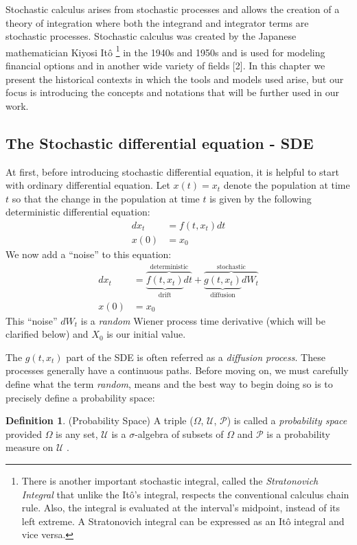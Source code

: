 \documentclass[12pt,twoside]{reedthesis}
\theoremstyle{definition}
\newtheorem{definition}{Definition}[section]
\theoremstyle{definition}
\theoremstyle{remark}
\begin{document}
  Stochastic calculus arises from stochastic processes and allows the
  creation of a theory of integration where both the integrand and
  integrator terms are stochastic processes. Stochastic calculus was
  created by the Japanese mathematician Kiyosi Itô
  \footnote{There is another important stochastic integral, called the \textit{Stratonovich Integral} that unlike the Itô's integral, respects the conventional calculus chain rule. Also, the integral is evaluated at the interval's midpoint, instead of its left extreme. A Stratonovich integral can be expressed as an Itô integral and vice versa.}
  in the 1940s and 1950s and is used for modeling financial options and in
  another wide variety of fields {[}2{]}. In this chapter we present the
  historical contexts in which the tools and models used arise, but our
  focus is introducing the concepts and notations that will be further
  used in our work.
  
  \subsection{The Stochastic differential equation -
  SDE}\label{the-stochastic-differential-equation---sde}
  
  At first, before introducing stochastic differential equation, it is
  helpful to start with ordinary differential equation. Let \(x(t) = x_t\)
  denote the population at time \(t\) so that the change in the population
  at time \(t\) is given by the following deterministic differential
  equation:
  \begin{align}
  dx_t &= f(t, x_t)dt \\
  x(0) &= x_0 \nonumber
  \end{align}
  We now add a ``noise'' to this equation:
  \begin{align} \label{sde1}
  dx_t &= \overbrace{\underbrace{f(t, x_t)}_\text{drift}dt}^\text{deterministic} + \overbrace{\underbrace{g(t, x_t)}_\text{diffusion}dW_t}^\text{stochastic} \\
  x(0) &= x_0 \nonumber
  \end{align}
  This ``noise'' \(dW_t\) is a \emph{random} Wiener process time
  derivative (which will be clarified below) and \(X_0\) is our initial
  value.
  
  The \(g(t, x_t)\) part of the SDE is often referred as a \emph{diffusion
  process}. These processes generally have a continuous paths. Before
  moving on, we must carefully define what the term \emph{random}, means
  and the best way to begin doing so is to precisely define a probability
  space:
  \begin{definition}{(Probability Space)} A triple ($\Omega$, $\mathcal {U}$, $\mathcal {P}$) is called a \textit{probability space} provided $\Omega$ is any set, $\mathcal {U}$ is a $\sigma$-algebra of subsets of $\Omega$ and $\mathcal {P}$ is a probability measure on $\mathcal {U}$ .
  \end{definition}
\end{document}
